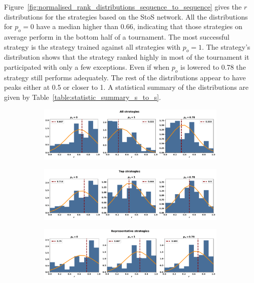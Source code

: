 Figure~\ref{fig:normalised_rank_distributions_sequence_to_sequence} gives the
\(r\) distributions for the strategies based on the StoS network. All the
distributions for \(p_o=0\) have a median higher than 0.66, indicating that
those strategies on average perform in the bottom half of a tournament. The most
successful strategy is the strategy trained against all strategies with
\(p_o=1\). The strategy's distribution shows that the strategy ranked highly in
most of the tournament it participated with only a few exceptions. Even if when
\(p_o\) is lowered to 0.78 the strategy still performs adequately. The rest
of the distributions appear to have peaks either at 0.5 or closer to 1. A
statistical summary of the distributions are given by
Table~\ref{table:statistic_summary_s_to_s}.

\begin{figure}[!htbp]
    \begin{subfigure}{\textwidth}
    \includegraphics[width=\textwidth]{src/chapters/07/img/normalised_rank_all_strategies.pdf}
    \end{subfigure}
    \par\bigskip
    \begin{subfigure}{\textwidth}
    \includegraphics[width=\textwidth]{src/chapters/07/img/normalised_rank_top_strategies.pdf}
    \end{subfigure}
    \par\bigskip
    \begin{subfigure}{\textwidth}
    \includegraphics[width=\textwidth]{src/chapters/07/img/normalised_rank_representative_strategies.pdf}

\end{subfigure}
\end{figure}
